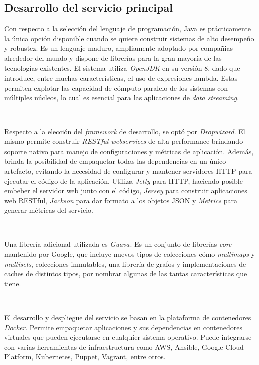 \documentclass[a4paper,12pt, oneside]{article}
\begin{document}
\subsection{Desarrollo del servicio principal}
Con respecto a la selección del lenguaje de programación, Java\cite{java} es prácticamente la única opción disponible cuando se quiere construir sistemas de alto desempeño y robustez. Es un lenguaje maduro, ampliamente adoptado por compañias alrededor del mundo y dispone de librerías para la gran mayoría de las tecnologías existentes. El sistema utiliza \textit{OpenJDK} en su versión 8, dado que introduce, entre muchas características, el uso de expresiones lambda. Estas permiten explotar las capacidad de cómputo paralelo de los sistemas con múltiples núcleos, lo cual es esencial para las aplicaciones de \textit{data streaming}.

\

Respecto a la elección del \textit{framework} de desarrollo, se optó por \textit{Dropwizard}\cite{dropwizard}. El mismo permite construir \textit{RESTful webservices} de alta performance brindando soporte nativo para manejo de configuraciones y métricas de aplicación. Además, brinda la posibilidad de empaquetar todas las dependencias en un único artefacto, evitando la necesidad de configurar y mantener servidores HTTP para ejecutar el código de la aplicación. Utiliza \textit{Jetty}\cite{jetty} para HTTP, haciendo posible embeber el servidor web junto con el código, \textit{Jersey}\cite{jersey} para construir aplicaciones web RESTful, \textit{Jackson}\cite{jackson} para dar formato a los objetos JSON y \textit{Metrics}\cite{metrics} para generar métricas del servicio.

\

Una librería adicional utilizada es \textit{Guava}\cite{guava}. Es un conjunto de librerías \textit{core} mantenido por Google, que incluye nuevos tipos de colecciones cómo \textit{multimaps} y \textit{multisets}, colecciones inmutables, una librería de grafos y implementaciones de caches de distintos tipos, por nombrar algunas de las tantas características que tiene.

\

El desarrollo y despliegue del servicio se basan en la plataforma de contenedores \textit{Docker}\cite{docker}. Permite empaquetar aplicaciones y sus dependencias en contenedores virtuales que pueden ejecutarse en cualquier sistema operativo. Puede integrarse con varias herramientas de infraestructura como AWS, Ansible, Google Cloud Platform, Kubernetes, Puppet, Vagrant, entre otros.
\end{document}
